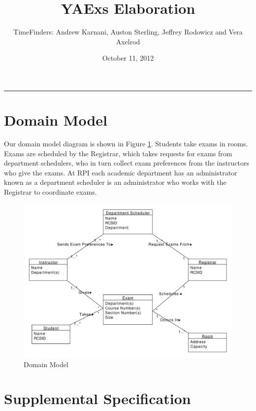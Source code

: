 \documentclass[11pt]{article}
\title{YAExs Elaboration}
\author{TimeFinders: Andrew Karnani, Auston Sterling, Jeffrey Rodowicz and Vera Axelrod}
\date{October 11, 2012}
\begin{document}
\maketitle
\tableofcontents
\vspace{0.2in}
\hrule
\vspace{1in}


\section{Domain Model} %
Our domain model diagram is shown in Figure \ref{fig:Domain}.  Students take exams in rooms. Exams are scheduled by the Registrar, which takes requests for exams from department schedulers, who in turn collect exam preferences from the instructors who give the exams. At RPI each academic department has an administrator known as a  department scheduler is an administrator who works with the Registrar to coordinate exams.
\begin{figure}
	\centering
		\includegraphics[width = \textwidth]{domainDiagram.pdf}
	\caption{Domain Model}
	\label{fig:Domain}
\end{figure}

\section{Supplemental Specification} %
\end{document}
